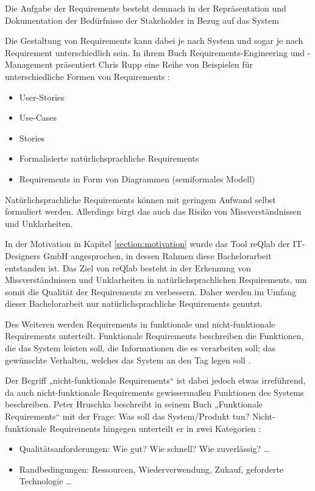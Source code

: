     Die Aufgabe der Requirements besteht demnach in der Repräsentation und Dokumentation der Bedürfnisse der Stakeholder in Bezug auf das System

    \newpage

    Die Gestaltung von Requirements kann dabei je nach System und sogar je nach Requirement unterschiedlich sein.
    In ihrem Buch \glqq{}Requirements-Engineering und -Management\grqq{} präsentiert Chris Rupp eine Reihe von Beispielen für unterschiedliche Formen von Requirements \autocite[][S. 19]{Rupp2014}:
    \begin{itemize}
        \item User-Stories
        \item Use-Cases
        \item Stories
        \item Formalisierte natürlichsprachliche Requirements
        \item Requirements in Form von Diagrammen (semiformales Modell)
    \end{itemize}

    
    Natürlichsprachliche Requirements können mit geringem Aufwand selbst formuliert werden.
    Allerdings birgt das auch das Risiko von Missverständnissen und Unklarheiten.

    In der Motivation in Kapitel \ref{section:motivation} wurde das Tool reQlab der IT-Designers GmbH angesprochen, in dessen Rahmen diese Bachelorarbeit entstanden ist.
    Das Ziel von reQlab besteht in der Erkennung von Missverständnissen und Unklarheiten in natürlichsprachlichen Requirements, um somit die Qualität der Requirements zu verbessern.
    Daher werden im Umfang dieser Bachelorarbeit nur natürlichsprachliche Requirements genutzt.

    Des Weiteren werden Requirements in funktionale und nicht-funktionale Requirements unterteilt.
    Funktionale Requirements beschreiben \glqq{}die Funktionen, die das System leisten soll, die Informationen die es verarbeiten soll; das gewünschte Verhalten, welches das System an den Tag legen soll\grqq{} \autocite[][S. 12]{Hruschka2023}.

    Der Begriff „nicht-funktionale Requirements“ ist dabei jedoch etwas irreführend, da auch nicht-funktionale Requirements gewissermaßen Funktionen des Systems beschreiben. Peter Hruschka beschreibt in seinem Buch „Funktionale Requirements“ mit der Frage: \glqq{}Was soll das System/Produkt tun?\grqq{}
    Nicht-funktionale Requirements hingegen unterteilt er in zwei Kategorien \autocite[][S. 13]{Hruschka2023}:
    \begin{itemize}
      \item Qualitätsanforderungen: \glqq{}Wie gut? Wie schnell? Wie zuverlässig? \ldots\grqq{}
      \item Randbedingungen: \glqq{}Ressourcen, Wiederverwendung, Zukauf, geforderte Technologie \ldots\grqq{}
    \end{itemize}
    
